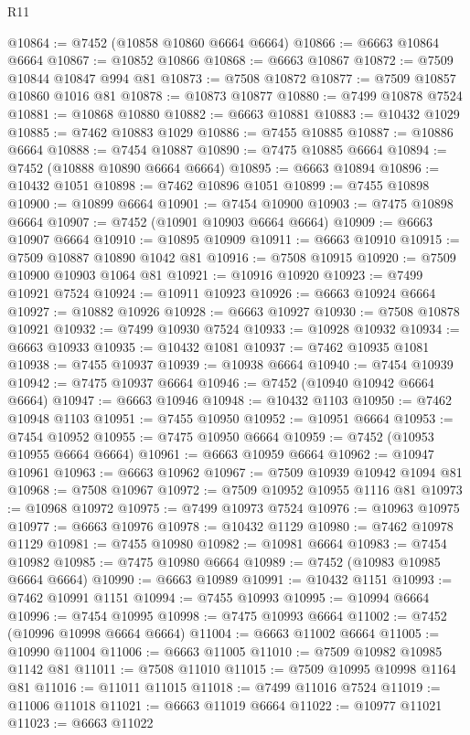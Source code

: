 \begin{lexlean}{R11}
\begin{coremodule}
{{{{{{{{{{{{{{{{{{{{{{{{{{{{{{{{{{{{{{{{{{{{{{{{{{{{{{{{{{{{{{{{{{{{{{{{{{{{{{{{{{@10864 := @7452 (@10858 @10860 @6664 @6664)
@10866 := @6663 @10864 @6664
@10867 := @10852 @10866
@10868 := @6663 @10867
@10872 := @7509 @10844 @10847 @994 @81
@10873 := @7508 @10872
@10877 := @7509 @10857 @10860 @1016 @81
@10878 := @10873 @10877
@10880 := @7499 @10878 @7524
@10881 := @10868 @10880
@10882 := @6663 @10881
@10883 := @10432 @1029
@10885 := @7462 @10883 @1029
@10886 := @7455 @10885
@10887 := @10886 @6664
@10888 := @7454 @10887
@10890 := @7475 @10885 @6664
@10894 := @7452 (@10888 @10890 @6664 @6664)
@10895 := @6663 @10894
@10896 := @10432 @1051
@10898 := @7462 @10896 @1051
@10899 := @7455 @10898
@10900 := @10899 @6664
@10901 := @7454 @10900
@10903 := @7475 @10898 @6664
@10907 := @7452 (@10901 @10903 @6664 @6664)
@10909 := @6663 @10907 @6664
@10910 := @10895 @10909
@10911 := @6663 @10910
@10915 := @7509 @10887 @10890 @1042 @81
@10916 := @7508 @10915
@10920 := @7509 @10900 @10903 @1064 @81
@10921 := @10916 @10920
@10923 := @7499 @10921 @7524
@10924 := @10911 @10923
@10926 := @6663 @10924 @6664
@10927 := @10882 @10926
@10928 := @6663 @10927
@10930 := @7508 @10878 @10921
@10932 := @7499 @10930 @7524
@10933 := @10928 @10932
@10934 := @6663 @10933
@10935 := @10432 @1081
@10937 := @7462 @10935 @1081
@10938 := @7455 @10937
@10939 := @10938 @6664
@10940 := @7454 @10939
@10942 := @7475 @10937 @6664
@10946 := @7452 (@10940 @10942 @6664 @6664)
@10947 := @6663 @10946
@10948 := @10432 @1103
@10950 := @7462 @10948 @1103
@10951 := @7455 @10950
@10952 := @10951 @6664
@10953 := @7454 @10952
@10955 := @7475 @10950 @6664
@10959 := @7452 (@10953 @10955 @6664 @6664)
@10961 := @6663 @10959 @6664
@10962 := @10947 @10961
@10963 := @6663 @10962
@10967 := @7509 @10939 @10942 @1094 @81
@10968 := @7508 @10967
@10972 := @7509 @10952 @10955 @1116 @81
@10973 := @10968 @10972
@10975 := @7499 @10973 @7524
@10976 := @10963 @10975
@10977 := @6663 @10976
@10978 := @10432 @1129
@10980 := @7462 @10978 @1129
@10981 := @7455 @10980
@10982 := @10981 @6664
@10983 := @7454 @10982
@10985 := @7475 @10980 @6664
@10989 := @7452 (@10983 @10985 @6664 @6664)
@10990 := @6663 @10989
@10991 := @10432 @1151
@10993 := @7462 @10991 @1151
@10994 := @7455 @10993
@10995 := @10994 @6664
@10996 := @7454 @10995
@10998 := @7475 @10993 @6664
@11002 := @7452 (@10996 @10998 @6664 @6664)
@11004 := @6663 @11002 @6664
@11005 := @10990 @11004
@11006 := @6663 @11005
@11010 := @7509 @10982 @10985 @1142 @81
@11011 := @7508 @11010
@11015 := @7509 @10995 @10998 @1164 @81
@11016 := @11011 @11015
@11018 := @7499 @11016 @7524
@11019 := @11006 @11018
@11021 := @6663 @11019 @6664
@11022 := @10977 @11021
@11023 := @6663 @11022
}}}}}}}}}}}}}}}}}}}}}}}}}}}}}}}}}}}}}}}}}}}}}}}}}}}}}}}}}}}}}}}}}}}}}}}}}}}}}}}}}}
\end{coremodule}
\end{lexlean}
